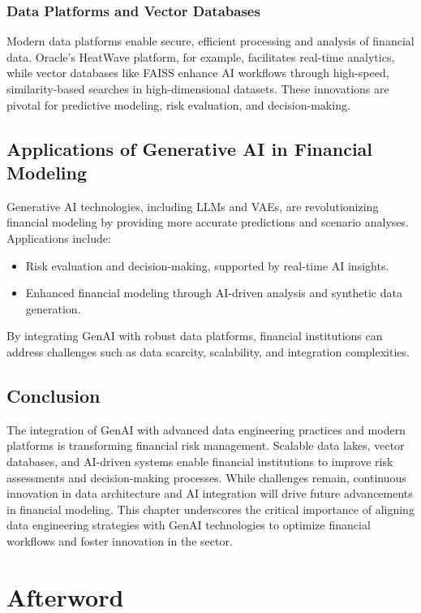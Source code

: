 \documentclass[a4paper,headinclude=on,footinclude=on,12pt,oneside]{scrbook}
\begin{document}
\subsection{Data Platforms and Vector Databases}
Modern data platforms enable secure, efficient processing and analysis of financial data. Oracle's HeatWave platform, for example, facilitates real-time analytics, while vector databases like FAISS enhance AI workflows through high-speed, similarity-based searches in high-dimensional datasets. These innovations are pivotal for predictive modeling, risk evaluation, and decision-making.

\section{Applications of Generative AI in Financial Modeling}
Generative AI technologies, including LLMs and VAEs, are revolutionizing financial modeling by providing more accurate predictions and scenario analyses. Applications include:
\begin{itemize}
	\item Risk evaluation and decision-making, supported by real-time AI insights.
	\item Enhanced financial modeling through AI-driven analysis and synthetic data generation.
\end{itemize}
By integrating GenAI with robust data platforms, financial institutions can address challenges such as data scarcity, scalability, and integration complexities.

\section{Conclusion}
The integration of GenAI with advanced data engineering practices and modern platforms is transforming financial risk management. Scalable data lakes, vector databases, and AI-driven systems enable financial institutions to improve risk assessments and decision-making processes. While challenges remain, continuous innovation in data architecture and AI integration will drive future advancements in financial modeling. This chapter underscores the critical importance of aligning data engineering strategies with GenAI technologies to optimize financial workflows and foster innovation in the sector.







\chapter*{Afterword}
\end{document}
